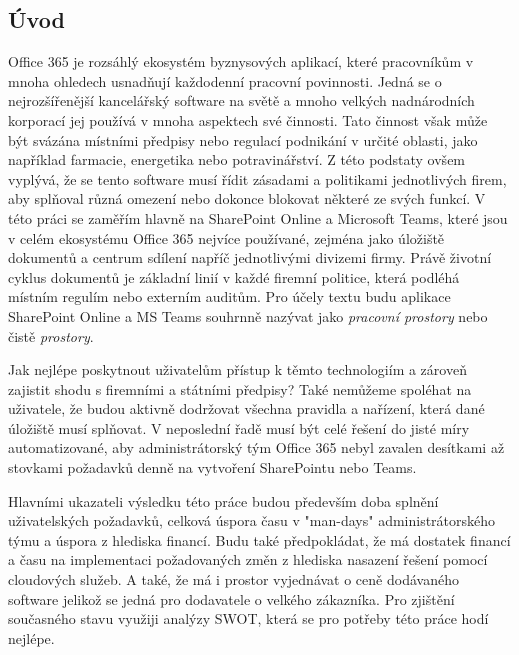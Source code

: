 \documentclass[12pt]{article}
\begin{document}
\begin{sloppypar}
\begin{spacing}{1.15}
		\section*{Úvod}
	    Office 365 je rozsáhlý ekosystém byznysových aplikací, které pracovníkům
        v mnoha ohledech usnadňují každodenní pracovní povinnosti. Jedná se o 
        nejrozšířenější kancelářský software na světě a mnoho velkých 
        nadnárodních korporací jej používá v mnoha aspektech své činnosti. 
        Tato činnost však může být svázána místními předpisy nebo regulací 
        podnikání v určité oblasti, jako například farmacie, energetika nebo 
        potravinářství. Z této podstaty ovšem vyplývá, že se tento software musí
        řídit zásadami a politikami jednotlivých firem, aby splňoval různá 
        omezení nebo dokonce blokovat některé ze svých funkcí. V této práci se 
        zaměřím hlavně na SharePoint Online a Microsoft Teams, které jsou v celém 
        ekosystému Office 365 nejvíce používané, zejména jako úložiště dokumentů 
        a centrum sdílení napříč jednotlivými divizemi firmy. Právě životní 
        cyklus dokumentů je základní linií v každé firemní politice, která 
        podléhá místním regulím nebo externím auditům. Pro účely textu
        budu aplikace SharePoint Online a MS Teams souhrnně nazývat jako
        \textit{pracovní prostory} nebo čistě \textit{prostory}. 

        Jak nejlépe poskytnout uživatelům přístup k těmto technologiím a zároveň 
        zajistit shodu s firemními a státními předpisy? Také nemůžeme spoléhat na 
        uživatele, že budou aktivně dodržovat všechna pravidla a nařízení, která 
        dané úložiště musí splňovat. V neposlední řadě musí být celé řešení do 
        jisté míry automatizované, aby administrátorský tým Office 365 nebyl 
        zavalen desítkami až stovkami požadavků denně na vytvoření SharePointu 
        nebo Teams.
        
        Hlavními ukazateli výsledku této práce budou především doba splnění 
        uživatelských požadavků, celková úspora času v "man-days" administrátorského 
        týmu a úspora z hlediska financí. Budu také předpokládat, že má dostatek
        financí a času na implementaci požadovaných změn z hlediska nasazení řešení
        pomocí cloudových služeb. A také, že má i prostor vyjednávat o ceně dodávaného
        software jelikož se jedná pro dodavatele o velkého zákazníka. Pro
        zjištění současného stavu využiji analýzy SWOT, která se pro potřeby
        této práce hodí nejlépe.
        

\end{spacing}
\end{sloppypar}
\end{document}
